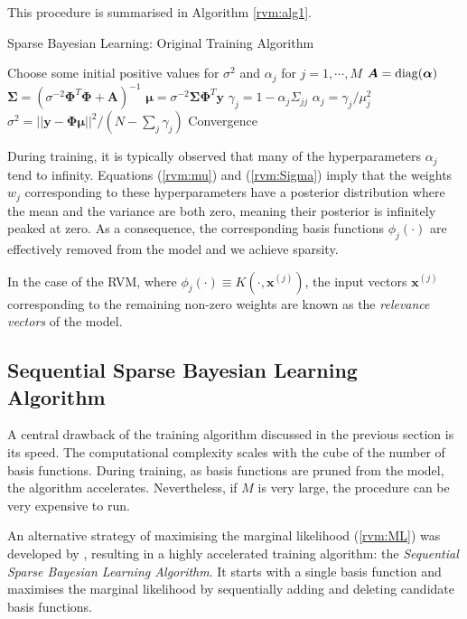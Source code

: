 This procedure is summarised in Algorithm \ref{rvm:alg1}.
\begin{algorithm}
  \caption{Sparse Bayesian Learning: Original Training Algorithm}
  \label{rvm:alg1}
  \begin{algorithmic}[1]
    \State Choose some initial positive values for $\sigma^2$ and $\alpha_j$ for $j=1,\cdots,M$ 
    \Repeat
    \State $\bm A = \operatorname*{diag}(\bm\alpha)$
    \State $\bm\Sigma = \left(\sigma^{-2}\bm\Phi^T\bm\Phi + \bm A\right)^{-1}$
    \State $\bm\mu = \sigma^{-2}\bm\Sigma\bm\Phi^T\bm y$
    \Statex
    \State $\gamma_j = 1 - \alpha_j \Sigma_{jj}$
    \State $\alpha_j = \gamma_j/\mu_j^2$
    \EndFor
    \State $\sigma^2 =||\bm y - \bm\Phi\bm\mu||^2 / (N - \sum_j\gamma_j)$
    \Until Convergence
  \end{algorithmic}
\end{algorithm}

During training, it is typically observed that many of the hyperparameters $\alpha_j$ tend to infinity.
Equations (\ref{rvm:mu}) and (\ref{rvm:Sigma}) imply that the weights $w_j$ corresponding to these hyperparameters have a posterior distribution where the mean and the variance are both zero, meaning their posterior is infinitely peaked at zero.
As a consequence, the corresponding basis functions $\phi_j(\cdot)$ are effectively removed from the model and we achieve sparsity.

In the case of the RVM, where $\phi_j(\cdot) \equiv K(\cdot, \bm x^{(j)})$, the input vectors $\bm x^{(j)}$ corresponding to the remaining non-zero weights are known as the \emph{relevance vectors} of the model.

\subsection{Sequential Sparse Bayesian Learning Algorithm}
A central drawback of the training algorithm discussed in the previous section is its speed. 
The computational complexity scales with the cube of the number of basis functions.
During training, as basis functions are pruned from the model, the algorithm accelerates.
Nevertheless, if $M$ is very large, the procedure can be very expensive to run.

An alternative strategy of maximising the marginal likelihood (\ref{rvm:ML}) was developed by \cite{tipping2003}, resulting in a highly accelerated training algorithm: the \emph{Sequential Sparse Bayesian Learning Algorithm}.
It starts with a single basis function and maximises the marginal likelihood by sequentially adding and deleting candidate basis functions.

